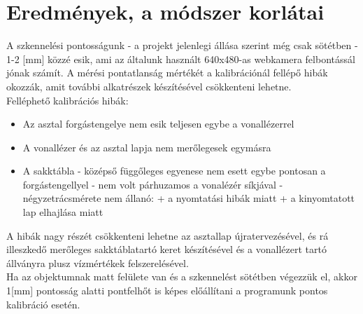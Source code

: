 \documentclass[12pt,a4paper]{article}
\begin{document}
\section{Eredmények, a módszer korlátai} %
A szkennelési pontosságunk - a projekt jelenlegi állása szerint még csak sötétben - 1-2 [mm] közzé esik, ami az általunk használt 640x480-as webkamera felbontássál jónak számít. A mérési pontatlanság mértékét a kalibrációnál fellépő hibák okozzák, amit további alkatrészek készítésével csökkenteni lehetne.\\[10pt]
Felléphető kalibrációs hibák:
\begin{itemize}
	\item Az asztal forgástengelye nem esik teljesen egybe a vonallézerrel
	\item A vonallézer és az asztal lapja nem merőlegesek egymásra
	\item A sakktábla
	\subitem - középső függőleges egyenese nem esett egybe pontosan a forgástengellyel
	\subitem - nem volt párhuzamos a vonalézér síkjával
	\subitem - négyzetrácsmérete nem állanó:
	\subsubitem + a nyomtatási hibák miatt
	\subsubitem + a kinyomtatott lap elhajlása miatt
\end{itemize}
A hibák nagy részét csökkenteni lehetne az asztallap újratervezésével, és rá illeszkedő merőleges sakktáblatartó keret készítésével és a vonallézert tartó állványra plusz vízmértékek felszerelésével.\\[10pt]
Ha az objektumnak matt felülete van és a szkennelést sötétben végezzük el, akkor 1[mm] pontosság alatti pontfelhőt is képes előállítani a programunk pontos kalibráció esetén.\\[10pt]
\end{document}
